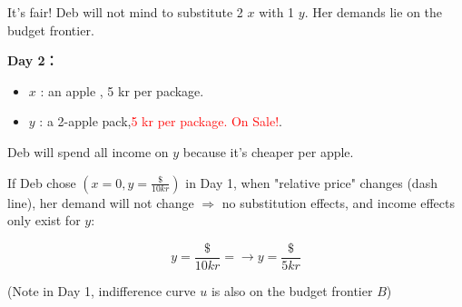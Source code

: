\documentclass{article}
\begin{document}
\begin{mdframed}[backgroundcolor=blue!20,linecolor=white]
It's fair! Deb will not mind to substitute 2 $x$ with 1 $y$. Her demands lie on the budget frontier.

\vspace{2mm}

\textbf{Day 2：}

\begin{itemize}
\item $x$ : an apple , 5 kr per package.
\item $y$ : a 2-apple pack,\textcolor{red}{5 kr per package. On Sale!}.
\end{itemize}

\begin{center}
\label{fig:fair}
\end{center}
\vspace{2mm}

Deb will spend all income on $y$ because it's cheaper per apple. 

If Deb chose $(x=0,y=\frac{\$}{10 kr})$ in Day 1, when "relative price" changes (dash line), her demand 
will not change $\Rightarrow$ no substitution effects, and income effects only exist for $y$:

$$y = \frac{\$}{10kr} =  \to y= \frac{\$}{5kr}$$

(Note in Day 1, indifference curve $u$ is also on the budget frontier $B$)

\vspace{2mm}


\end{mdframed}
\end{document}
